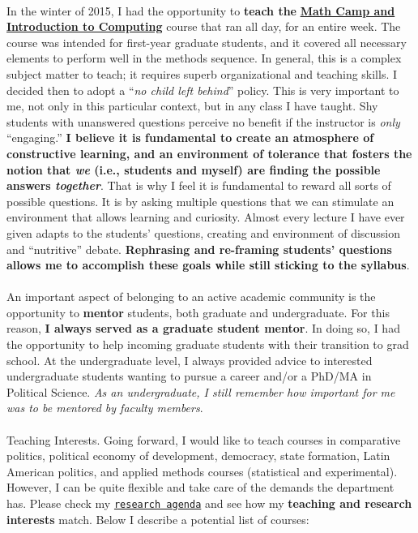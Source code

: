 \documentclass[letterpaper]{article}
\begin{document}
\paragraph{}In the winter of 2015, I had the opportunity to {\bf teach the} \href{https://github.com/hbahamonde/Math-Camp/raw/master/Syllabus/Math_Camp_Syllabus.pdf}{{\bf Math Camp and Introduction to Computing}} course that ran all day, for an entire week. The course was intended for first-year graduate students, and it covered all necessary elements to perform well in the methods sequence. In general, this is a complex subject matter to teach; it requires superb organizational and teaching skills. I decided then to adopt a ``\emph{no child left behind}'' policy. This is very important to me, not only in this particular context, but in any class I have taught. Shy students with unanswered questions perceive no benefit if the instructor is \emph{only} ``engaging.'' {\bf I believe it is fundamental to create an atmosphere of constructive learning, and an environment of tolerance that fosters the notion that \emph{we} (i.e., students and myself) are finding the possible answers \emph{together}}. That is why I feel it is fundamental to reward all sorts of possible questions. It is by asking multiple questions that we can stimulate an environment that allows learning and curiosity. Almost every lecture I have ever given adapts to the students' questions, creating and environment of discussion and ``nutritive'' debate. {\bf Rephrasing and re-framing students' questions allows me to accomplish these goals while still sticking to the syllabus}. 

\paragraph{}An important aspect of belonging to an active academic community is the opportunity to {\bf mentor} students, both graduate and undergraduate. For this reason, {\bf I always served as a graduate student mentor}. In doing so, I had the opportunity to help incoming graduate students with their transition to grad school. At the undergraduate level, I always provided advice to interested undergraduate students wanting to pursue a career and/or a PhD/MA in Political Science. \emph{As an undergraduate, I still remember how important for me was to be mentored by faculty members}.

\paragraph{}{Teaching Interests.} Going forward, I would like to teach courses in comparative politics, political economy of development, democracy, state formation, Latin American politics, and applied methods courses (statistical and experimental). However, I can be quite flexible and take care of the demands the department has. Please check my \href{http://www.hectorbahamonde.com/research/}{\texttt{research agenda}} and see how my {\bf teaching and research interests} match. Below I describe a potential list of courses:
\end{document}
